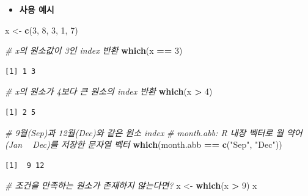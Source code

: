 \documentclass[
  11pt,
]{krantz}
\newenvironment{Shaded}{\begin{snugshade}}{\end{snugshade}}
\newcommand{\CommentTok}[1]{\textcolor[rgb]{0.37,0.37,0.37}{\textit{#1}}}
\newcommand{\DecValTok}[1]{\textcolor[rgb]{0.06,0.06,0.06}{#1}}
\newcommand{\KeywordTok}[1]{\textcolor[rgb]{0.27,0.27,0.27}{\textbf{#1}}}
\newcommand{\NormalTok}[1]{#1}
\newcommand{\OperatorTok}[1]{\textcolor[rgb]{0.43,0.43,0.43}{\textbf{#1}}}
\newcommand{\StringTok}[1]{\textcolor[rgb]{0.5,0.5,0.5}{#1}}
\providecommand{\tightlist}{%
  \setlength{\itemsep}{0pt}\setlength{\parskip}{0pt}}
\begin{document}
\normalsize

\begin{itemize}
\tightlist
\item
  \textbf{사용 예시}
\end{itemize}

\footnotesize

\begin{Shaded}
\begin{Highlighting}[]
\NormalTok{x <-}\StringTok{ }\KeywordTok{c}\NormalTok{(}\DecValTok{3}\NormalTok{, }\DecValTok{8}\NormalTok{, }\DecValTok{3}\NormalTok{, }\DecValTok{1}\NormalTok{, }\DecValTok{7}\NormalTok{)}

\CommentTok{# x의 원소값이 3인 index 반환}
\KeywordTok{which}\NormalTok{(x }\OperatorTok{==}\StringTok{ }\DecValTok{3}\NormalTok{)}
\end{Highlighting}
\end{Shaded}

\begin{verbatim}
[1] 1 3
\end{verbatim}

\begin{Shaded}
\begin{Highlighting}[]
\CommentTok{# x의 원소가 4보다 큰 원소의 index 반환}
\KeywordTok{which}\NormalTok{(x }\OperatorTok{>}\StringTok{ }\DecValTok{4}\NormalTok{)}
\end{Highlighting}
\end{Shaded}

\begin{verbatim}
[1] 2 5
\end{verbatim}

\begin{Shaded}
\begin{Highlighting}[]
\CommentTok{# 9월(Sep)과 12월(Dec)와 같은 원소 index}
\CommentTok{# month.abb: R 내장 벡터로 월 약어(Jan ~ Dec)를 저장한 문자열 벡터}
\KeywordTok{which}\NormalTok{(month.abb }\OperatorTok{==}\StringTok{ }\KeywordTok{c}\NormalTok{(}\StringTok{"Sep"}\NormalTok{, }\StringTok{"Dec"}\NormalTok{))}
\end{Highlighting}
\end{Shaded}

\begin{verbatim}
[1]  9 12
\end{verbatim}

\begin{Shaded}
\begin{Highlighting}[]
\CommentTok{# 조건을 만족하는 원소가 존재하지 않는다면?}
\NormalTok{x <-}\StringTok{ }\KeywordTok{which}\NormalTok{(x }\OperatorTok{>}\StringTok{ }\DecValTok{9}\NormalTok{)}
\NormalTok{x}
\end{Highlighting}
\end{Shaded}
\end{document}

